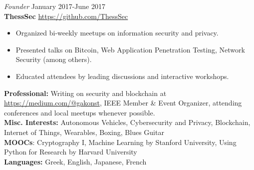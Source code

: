 \documentclass[margin, line]{res} %
\begin{document}
{\sl Founder} \hfill January 2017-June 2017 \\
\textbf{ThessSec} \hfill \url{https://github.com/ThessSec}
\begin{itemize} \itemsep -2pt %
    \item Organized bi-weekly meetups on information security and privacy.
    \item Presented talks on Bitcoin, Web Application Penetration Testing, Network Security (among others).
    \item Educated attendees by leading discussions and interactive workshops.
\end{itemize}

\textbf{Professional:}
Writing on security and blockchain at \url{https://medium.com/@gakonst}, %
IEEE Member \& Event Organizer, attending conferences and local meetups whenever possible.\\
\textbf{Misc. Interests:}
Autonomous Vehicles, Cybersecurity and Privacy, Blockchain, Internet of Things, Wearables, Boxing, Blues Guitar\\
\textbf{MOOCs}:
Cryptography I, Machine Learning by Stanford University, Using Python for Research by Harvard University\\
\textbf{Languages:}
Greek, English, Japanese, French  
\end{document}
